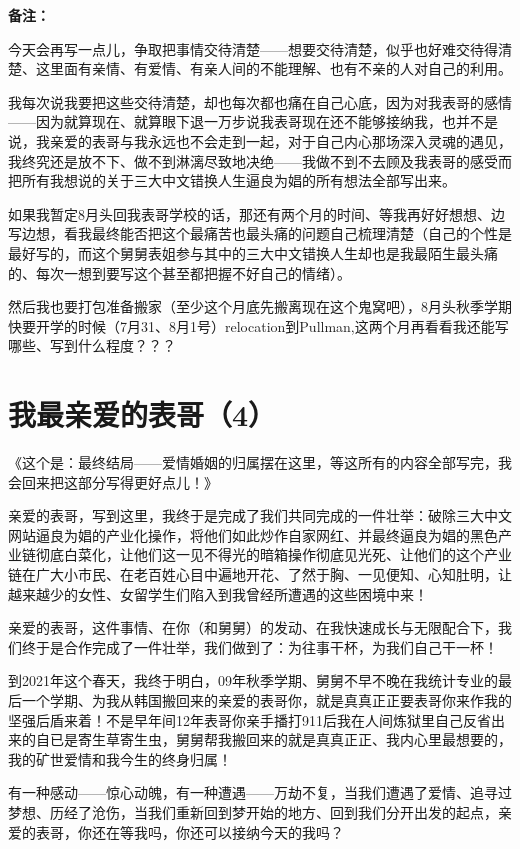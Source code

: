 \documentclass[9pt, b5paper]{article}
\begin{document}
\textbf{备注：}

今天会再写一点儿，争取把事情交待清楚——想要交待清楚，似乎也好难交待得清楚、这里面有亲情、有爱情、有亲人间的不能理解、也有不亲的人对自己的利用。

我每次说我要把这些交待清楚，却也每次都也痛在自己心底，因为对我表哥的感情——因为就算现在、就算眼下退一万步说我表哥现在还不能够接纳我，也并不是说，我亲爱的表哥与我永远也不会走到一起，对于自己内心那场深入灵魂的遇见，我终究还是放不下、做不到淋漓尽致地决绝——我做不到不去顾及我表哥的感受而把所有我想说的关于三大中文错换人生逼良为娼的所有想法全部写出来。

如果我暂定8月头回我表哥学校的话，那还有两个月的时间、等我再好好想想、边写边想，看我最终能否把这个最痛苦也最头痛的问题自己梳理清楚（自己的个性是最好写的，而这个舅舅表姐参与其中的三大中文错换人生却也是我最陌生最头痛的、每次一想到要写这个甚至都把握不好自己的情绪）。

然后我也要打包准备搬家（至少这个月底先搬离现在这个鬼窝吧），8月头秋季学期快要开学的时候（7月31、8月1号）relocation到Pullman,这两个月再看看我还能写哪些、写到什么程度？？？

\section{我最亲爱的表哥（4）}
\label{sec:org4f000f8}

《这个是：最终结局——爱情婚姻的归属摆在这里，等这所有的内容全部写完，我会回来把这部分写得更好点儿！》

亲爱的表哥，写到这里，我终于是完成了我们共同完成的一件壮举：破除三大中文网站逼良为娼的产业化操作，将他们如此炒作自家网红、并最终逼良为娼的黑色产业链彻底白菜化，让他们这一见不得光的暗箱操作彻底见光死、让他们的这个产业链在广大小市民、在老百姓心目中遍地开花、了然于胸、一见便知、心知肚明，让越来越少的女性、女留学生们陷入到我曾经所遭遇的这些困境中来！

亲爱的表哥，这件事情、在你（和舅舅）的发动、在我快速成长与无限配合下，我们终于是合作完成了一件壮举，我们做到了：为往事干杯，为我们自己干一杯！

到2021年这个春天，我终于明白，09年秋季学期、舅舅不早不晚在我统计专业的最后一个学期、为我从韩国搬回来的亲爱的表哥你，就是真真正正要表哥你来作我的坚强后盾来着！不是早年间12年表哥你亲手播打911后我在人间炼狱里自己反省出来的自已是寄生草寄生虫，舅舅帮我搬回来的就是真真正正、我内心里最想要的，我的矿世爱情和我今生的终身归属！

有一种感动——惊心动魄，有一种遭遇——万劫不复，当我们遭遇了爱情、追寻过梦想、历经了沧伤，当我们重新回到梦开始的地方、回到我们分开出发的起点，亲爱的表哥，你还在等我吗，你还可以接纳今天的我吗？
\end{document}
